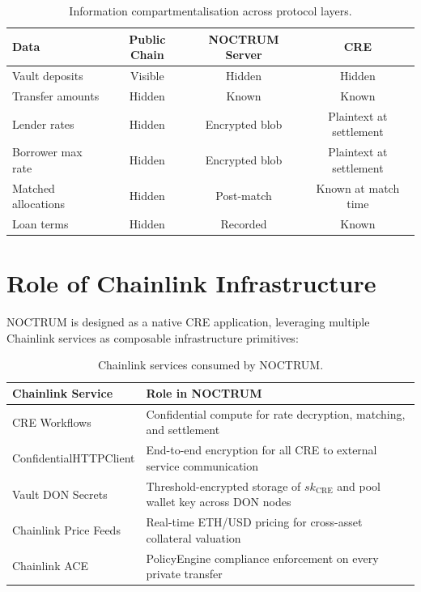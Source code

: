 \documentclass[a4paper,11pt]{article}
\begin{document}
\begin{table}[H]
\centering
\caption{Information compartmentalisation across protocol layers.}
\renewcommand{\arraystretch}{1.4}
\begin{tabular}{@{}p{}ccc@{}}
  \toprule
  \textbf{Data} & \textbf{Public Chain} & \textbf{NOCTRUM Server} & \textbf{CRE} \\
  \midrule
  Vault deposits        & Visible  & Hidden         & Hidden \\
  Transfer amounts      & Hidden   & Known          & Known \\
  Lender rates          & Hidden   & Encrypted blob & Plaintext at settlement \\
  Borrower max rate     & Hidden   & Encrypted blob & Plaintext at settlement \\
  Matched allocations   & Hidden   & Post-match     & Known at match time \\
  Loan terms            & Hidden   & Recorded       & Known \\
  \bottomrule
\end{tabular}
\label{tab:privacy}
\end{table}

\section{Role of Chainlink Infrastructure}

NOCTRUM is designed as a native CRE application, leveraging multiple Chainlink
services as composable infrastructure primitives:

\begin{table}[H]
\centering
\caption{Chainlink services consumed by NOCTRUM.}
\renewcommand{\arraystretch}{1.4}
\begin{tabular}{@{}p{}p{}@{}}
  \toprule
  \textbf{Chainlink Service} & \textbf{Role in NOCTRUM} \\
  \midrule
  CRE Workflows &
    Confidential compute for rate decryption, matching, and settlement \\
  ConfidentialHTTPClient &
    End-to-end encryption for all CRE to external service communication \\
  Vault DON Secrets &
    Threshold-encrypted storage of $sk_{\mathrm{CRE}}$ and pool wallet
    key across DON nodes \\
  Chainlink Price Feeds &
    Real-time ETH/USD pricing for cross-asset collateral valuation \\
  Chainlink ACE &
    PolicyEngine compliance enforcement on every private transfer \\
  \bottomrule
\end{tabular}
\label{tab:chainlink}
\end{table}
\end{document}

